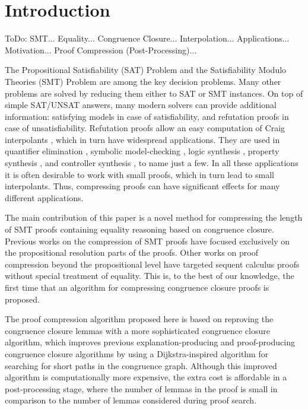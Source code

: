 \section{Introduction}

ToDo:
SMT... Equality... Congruence Closure... Interpolation... Applications... Motivation... Proof Compression (Post-Processing)...

The Propositional Satisfiability (SAT) Problem and the Satisfiability
Modulo Theories (SMT) Problem are among the key decision problems.
Many other problems are solved by reducing them either to SAT or SMT
instances. On top of simple SAT/UNSAT answers, many modern solvers
can provide additional information: satisfying models in case of
satisfiability, and refutation proofs in case of unsatisfiability.
Refutation proofs allow an easy computation of Craig interpolants
\cite{todo}, which in turn have widespread applications.
They are used in quantifier elimination \cite{todo}, symbolic model-checking \cite{todo}, logic synthesis \cite{todo},
property synthesis \cite{todo}, and
controller synthesis \cite{todo}, to
name just a few. In all these applications it is often desirable to
work with small proofs, which in turn lead to small interpolants.
Thus, compressing proofs can have significant effects for many
different applications. 


The main contribution of this paper is a novel method for compressing
the length of SMT proofs containing equality reasoning based on
congruence closure. Previous works \cite{Todo} on the compression of SMT proofs have
focused exclusively on the propositional resolution parts of the
proofs. Other works \cite{Todo} on
proof compression beyond the propositional level have targeted
sequent calculus proofs without special treatment of equality. This
is, to the best of our knowledge, the first time that an algorithm
for compressing congruence closure proofs is proposed.

The proof compression algorithm proposed here is based on reproving
the congruence closure lemmas with a more sophisticated congruence
closure algorithm, which improves previous explanation-producing
\cite{Nieuwenhuis2005,Nieuwenhuis2007} and proof-producing
\cite{Fontaine2004} congruence closure algorithms by using a
Dijkstra-inspired algorithm for searching for short paths in the
congruence graph. Although this improved algorithm is computationally
more expensive, the extra cost is affordable in a post-processing
stage, where the number of lemmas in the proof is small in comparison
to the number of lemmas considered during proof search.

